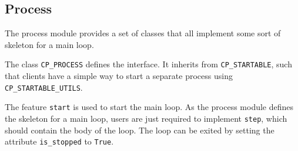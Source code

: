 % 
% 
%   
%     
%   
% 
%     
% 
% 
% 
% 
% 


\subsection{Process}

The process module provides a set of classes that all implement some sort of skeleton for a main loop.

The class \lstinline!CP_PROCESS! defines the interface.
It inherits from \lstinline!CP_STARTABLE!, such that clients have a simple way to start a separate process using \lstinline!CP_STARTABLE_UTILS!.

The feature \lstinline!start! is used to start the main loop.
As the process module defines the skeleton for a main loop, users are just required to implement \lstinline!step!, which should contain the body of the loop.
The loop can be exited by setting the attribute \lstinline!is_stopped! to \lstinline!True!.

